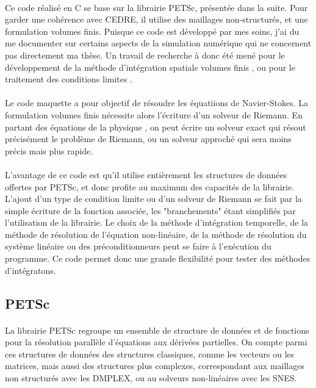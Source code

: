     \paragraph{}
    Ce code réalisé en C se base sur la librairie PETSc, présentée dans la suite.
    Pour garder une cohérence avec CEDRE, il utilise des maillages non-structurés, et une formulation volumes finis.
    Puisque ce code est développé par mes soins, j'ai du me documenter sur certains aspects de la simulation numérique qui ne concernent pas directement ma thèse.
    Un travail de recherche à donc été mené pour le développement de la méthode d'intégration spatiale volumes finis \cite{EymardGallouetHerbin2000}, ou pour le traitement des conditions limites \cite{PoinsotLele1992}.

    \paragraph{}
    Le code maquette a pour objectif de résoudre les équatiions de Navier-Stokes.
    La formulation volumes finis nécessite alors l'écriture d'un solveur de Riemann.
    En partant des équations de la physique \cite{Masatsuka2013}, on peut écrire un solveur exact \cite{GottliebGroth1988} qui résout précisément le problème de Riemann, ou un solveur approché \cite{Roe1981} qui sera moins précis mais plus rapide.

    \paragraph{}
    L'avantage de ce code est qu'il utilise entièrement les structures de données offertes par PETSc, et donc profite au maximum des capacités de la librairie.
    L'ajout d'un type de condition limite ou d'un solveur de Riemann se fait par la simple écriture de la fonction associée, les "branchements" étant simplifiés par l'utilisation de la librairie.
    Le choix de la méthode d'intégration temporelle, de la méthode de résolution de l'équation non-linéaire, de la méthode de résolution du système linéaire ou des préconditionneurs peut se faire à l'exécution du programme.
    Ce code permet donc une grande flexibilité pour tester des méthodes d'intégratons.

  \subsection{PETSc}

    \paragraph{}
    La librairie PETSc \cite{petsc-web-page, petsc-user-ref, petsc-efficient} regroupe un ensemble de structure de données et de fonctions pour la résolution parallèle d'équations aux dérivées partielles.
    On compte parmi ces structures de données des structures classiques, comme les vecteurs ou les matrices, mais aussi des structures plus complexes, correspondant aux maillages non structurés avec les DMPLEX, ou au solveurs non-linéaires avec les SNES.

